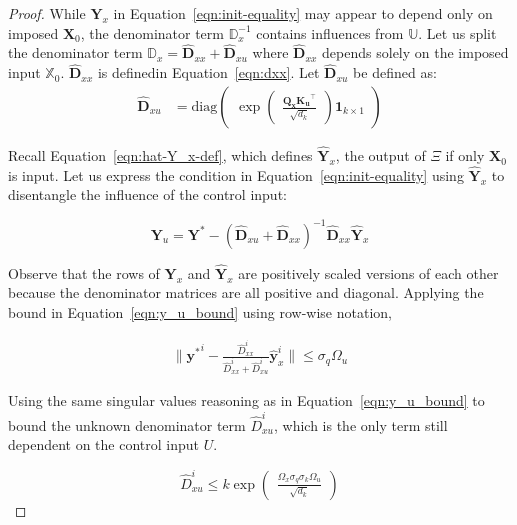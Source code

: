 \documentclass{article} %
\begin{document}
\begin{proof}
    While $\mathbf Y_x$ in Equation~\ref{eqn:init-equality} may appear to depend only on imposed $\mathbf X_0$, the denominator term $\mathbb D_x^{-1}$ contains influences from $\mathbb U$. Let us split the denominator term $\mathbb D_x = \hat{\mathbf D}_{xx} + \hat{\mathbf D}_{xu}$ where $\hat{\mathbf D}_{xx}$ depends solely on the imposed input $\mathbb X_0$. $\hat{\mathbf D}_{xx}$ is definedin Equation~\ref{eqn:dxx}. Let $\hat{\mathbf D}_{xu}$ be defined as: 
    \begin{align}
        \label{eqn:Dxu-definition}
        \hat{\mathbf D}_{xu} &= \text{diag}\begin{pmatrix}
            \exp\begin{pmatrix}
                \frac{\mathbf{Q_x K_u}^\top}{\sqrt{d_k}}
            \end{pmatrix}
            \mathbf 1_{k \times 1}
        \end{pmatrix} 
    \end{align}

    Recall Equation~\ref{eqn:hat-Y_x-def}, which defines $\hat{\mathbf Y}_x$, the output of $\Xi$ if only $\mathbf X_0$ is input. 
    Let us express the condition in Equation~\ref{eqn:init-equality} using $\hat{\mathbf Y}_x$ to disentangle the influence of the control input: 

    \begin{equation}
        \mathbf Y_u = \mathbf Y^* - (\hat{\mathbf D}_{xu} + \hat{\mathbf D}_{xx})^{-1} \hat{\mathbf D}_{xx} \hat{\mathbf Y}_x
    \end{equation}

    Observe that the rows of $\mathbf Y_x$ and $\hat{\mathbf Y}_x$ are positively scaled versions of each other because the denominator matrices are all positive and diagonal. 
    Applying the bound in Equation~\ref{eqn:y_u_bound} using row-wise notation, 

    \begin{align}
        \label{eqn:almost_done}
        \| {\mathbf y^*}^i - \frac{
            \hat D_{xx}^i
        }{
            \hat D_{xx}^i + \hat D_{xu}^i
        }
        \hat{\mathbf y}_x^i \| 
        \leq 
        \sigma_q \Omega_u
    \end{align}

    Using the same singular values reasoning as in Equation~\ref{eqn:y_u_bound} to bound the unknown denominator term $\hat D^i_{xu}$, which is the only term still dependent on the control input $U$. 

    \begin{equation}
        \hat D_{xu}^i \leq k \exp \begin{pmatrix}
            \frac{\Omega_x \sigma_q \sigma_k \Omega_u}{\sqrt{d_k}}
        \end{pmatrix}
    \end{equation}


\end{proof}
\end{document}
